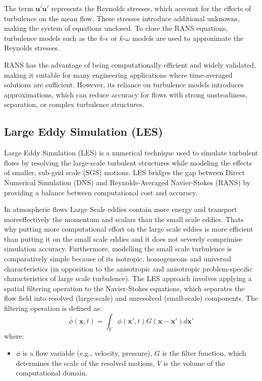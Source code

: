 The term $\overline{\mathbf{u}' \mathbf{u}'}$ represents the Reynolds stresses, 
which account for the effects of turbulence on the mean flow. 
These stresses introduce additional unknowns, making the system of equations unclosed. 
To close the RANS equations, turbulence models such as the $k$-$\epsilon$ or $k$-$\omega$ models are used to approximate the Reynolds stresses.

RANS has the advantage of being computationally efficient and widely validated, making it suitable for many engineering applications where time-averaged solutions are sufficient.
However, its reliance on turbulence models introduces approximations, which can reduce accuracy for flows with strong unsteadiness, separation, or complex turbulence structures.

\subsection{Large Eddy Simulation (LES)}
Large Eddy Simulation (LES) is a numerical technique used to simulate turbulent flows by resolving the large-scale turbulent structures 
while modeling the effects of smaller, sub-grid scale (SGS) motions. LES bridges the gap between Direct Numerical Simulation (DNS) 
and Reynolds-Averaged Navier-Stokes (RANS) by providing a balance between computational cost and accuracy.

In atmospheric flows Large Scale eddies contain more energy and transport moreeffectively the 
momentum and scalars than the small scale eddies\cite{spalart2000}. Thats why putting
more computational effort on the large scale eddies is more efficient than putting it on the small scale eddies and it 
does not severely comprimise simulation accuracy. Furthermore, modelling the small scale turbulence is comparatively simple because of
its isotropic, homogeneous and universal characteristics (in opposition to the anisotropic and
anisotropic problem-specific characteristics of large scale turbulence).
The LES approach involves applying a spatial filtering operation to the Navier-Stokes equations,
which separates the flow field into resolved (large-scale) and unresolved (small-scale) components.
The filtering operation is defined as: 
\begin{equation}
\overline{\phi}(\mathbf{x}, t) = \int_V \phi(\mathbf{x}', t) G(\mathbf{x} - \mathbf{x}') d\mathbf{x}'
\end{equation}
where:
\begin{itemize}
    \item $\phi$ is a flow variable (e.g., velocity, pressure), $G$ is the filter function, which determines the scale of the resolved motions, $V$ is the volume of the computational domain.
\end{itemize}

